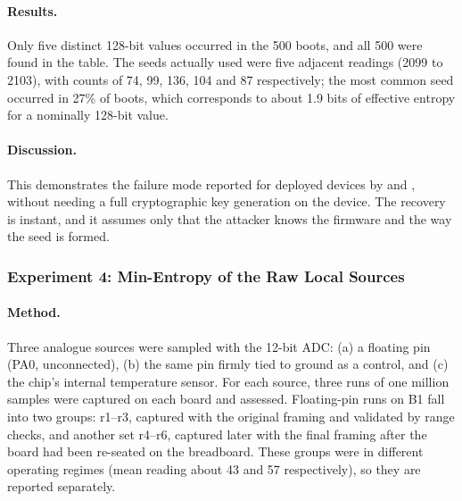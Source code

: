 \documentclass[a4paper, 12pt]{article}
\begin{document}
\paragraph{Results.} Only five distinct 128-bit values occurred in the 500 boots, and all 500 were found in the table. The seeds actually used were five adjacent readings (2099 to 2103), with counts of 74, 99, 136, 104 and 87 respectively; the most common seed occurred in 27\% of boots, which corresponds to about 1.9 bits of effective entropy for a nominally 128-bit value.
 
\paragraph{Discussion.} This demonstrates the failure mode reported for deployed devices by \citet{heninger2012mining} and \citet{mowery2013entropics}, without needing a full cryptographic key generation on the device. The recovery is instant, and it assumes only that the attacker knows the firmware and the way the seed is formed.
 
\subsubsection{Experiment 4: Min-Entropy of the Raw Local Sources}
\label{sec:bp_raw}

\paragraph{Method.} Three analogue sources were sampled with the 12-bit ADC: (a) a floating pin (PA0, unconnected), (b) the same pin firmly tied to ground as a control, and (c) the chip's internal temperature sensor. For each source, three runs of one million samples were captured on each board and assessed. Floating-pin runs on B1 fall into two groups: r1--r3, captured with the original framing and validated by range checks, and another set r4--r6, captured later with the final framing after the board had been re-seated on the breadboard. These groups were in different operating regimes (mean reading about 43 and 57 respectively), so they are reported separately.
  
\end{document}
